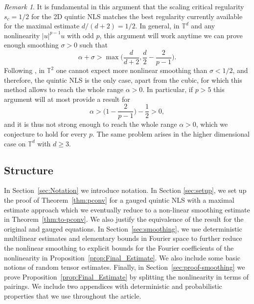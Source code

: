 \documentclass[11pt, xcolor = dvipsnames,reqno
]{amsart}
\theoremstyle{definition}
\theoremstyle{remark}
\newtheorem{rmk}[thm]{Remark}
\begin{document}
    \begin{rmk}
        It is fundamental in this argument that the scaling critical regularity $s_c = 1/2$ for the 2D quintic NLS matches the best regularity currently available for the maximal estimate $d/(d+2) = 1/2$. 
        In general, in $\mathbb T^d$ and any nonlinearity $|u|^{p-1} u$ with odd $p$, 
        this argument will work anytime we can prove enough smoothing $\sigma > 0$ such that 
        \begin{equation}
            \alpha + \sigma > \max \Big(  \frac{d}{d+2}, \frac{d}{2} - \frac{2}{p-1} \Big). 
        \end{equation}
        Following \cite{DNY2024}, in $\mathbb T^2$ one cannot expect more nonlinear smoothing than  $\sigma < 1/2$, and therefore, the quintic NLS is the only case, apart from the cubic, for which this method allows to reach the whole range $\alpha > 0$. 
        In particular, if $p > 5$ this argument will at most provide a result for 
        \begin{equation}
            \alpha 
            > \Big(1 - \frac{2}{p-1} \Big) - \frac{1}{2}
            > 0, 
        \end{equation}
        and it is thus not strong enough to reach the whole range $\alpha > 0$, which we conjecture to hold for every $p$. 
        The same problem arises in the higher dimensional case on $\mathbb T^d$ with $d \geq 3$.         
    \end{rmk}

    \subsection*{Structure}
    In Section~\ref{sec:Notation} we introduce notation. 
    In Section \ref{sec:setup}, we set up the proof of Theorem~\ref{thm:pconv} for a gauged quintic NLS with a maximal estimate approach which we eventually reduce to a non-linear smoothing estimate in Theorem~\ref{thm:to-pconv}. 
    We also justify the equivalence of the result for the original and gauged equations. 
    In Section~\ref{sec:smoothing}, we use deterministic multilinear estimates and elementary bounds in Fourier space to further reduce the nonlinear smoothing to explicit bounds for the Fourier coefficients of the nonlinearity in Proposition~\ref{prop:Final_Estimate}. 
    We also include some basic notions of random tensor estimates. Finally, in Section~\ref{sec:proof-smoothing} we prove Proposition~\ref{prop:Final_Estimate} by splitting the nonlinearity in terms of pairings.
    We include two appendices with deterministic and probabilistic properties that we use throughout the article. 
    
\end{document}
